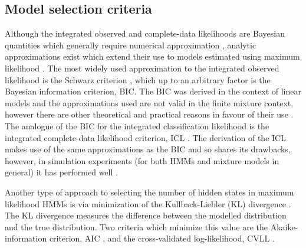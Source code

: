 \subsection{Model selection criteria}

Although the integrated observed and complete-data likelihoods are Bayesian quantities which generally require numerical approximation \cite{gelmanBayesianDataAnalysis2014}, analytic approximations exist which extend their use to models estimated using maximum likelihood \cite{kassBayesFactors1995, mclachlanFiniteMixtureModels2000}. The most widely used approximation to the integrated observed likelihood is the Schwarz criterion \cite{schwarzEstimatingDimensionModel1978a}, which up to an arbitrary factor is the Bayesian information criterion, BIC. The BIC was derived in the context of linear models and the approximations used are not valid in the finite mixture context, however there are other theoretical and practical reasons in favour of their use \cite{fraley1998many}. The analogue of the BIC for the integrated classification likelihood is the integrated complete-data likelihood criterion, ICL \cite{biernackiAssessingMixtureModel2000a}.  The derivation of the ICL makes use of the same approximations as the BIC and so shares its drawbacks, however, in simulation experiments (for both HMMs and mixture models in general) it has performed well \cite{mclachlanFiniteMixtureModels2000,celeuxSelectingHiddenMarkov2008, biernackiAssessingMixtureModel2000a}.

Another type of approach to selecting the number of hidden states in maximum likelihood HMMs is via minimization of the Kullback-Liebler (KL) divergence \cite{kullbackInformationSufficiency1951}. The KL divergence  measures the difference between the modelled distribution and the true distribution. Two criteria which minimize this value are the Akaike-information criterion, AIC \cite{akaikeInformationTheoryExtension1998}, and the cross-validated log-likelihood, CVLL \cite{celeuxSelectingHiddenMarkov2008}.  


